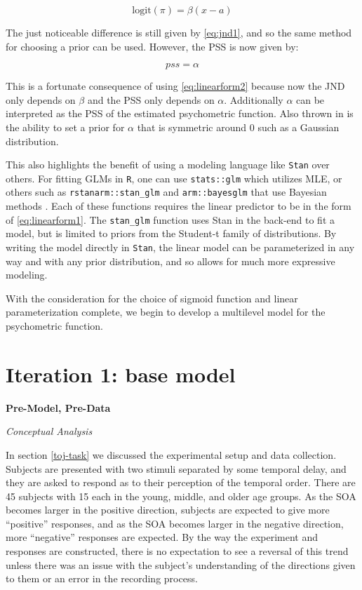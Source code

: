 \documentclass[11pt, oneside, openany]{scrbook}
\begin{document}
\begin{equation}
  \mathrm{logit}(\pi) = \beta(x - a)
  \label{eq:pfform2}
\end{equation}

The just noticeable difference is still given by \eqref{eq:jnd1}, and so the same method for choosing a prior can be used. However, the PSS is now given by:

\[pss = \alpha\]

This is a fortunate consequence of using \eqref{eq:linearform2} because now the JND only depends on \(\beta\) and the PSS only depends on \(\alpha\). Additionally \(\alpha\) can be interpreted as the PSS of the estimated psychometric function. Also thrown in is the ability to set a prior for \(\alpha\) that is symmetric around \(0\) such as a Gaussian distribution.

This also highlights the benefit of using a modeling language like \texttt{Stan} over others. For fitting GLMs in \texttt{R}, one can use \texttt{stats::glm} which utilizes MLE, or others such as \texttt{rstanarm::stan\_glm} and \texttt{arm::bayesglm} that use Bayesian methods \citep{R-rstanarm, R-arm}. Each of these functions requires the linear predictor to be in the form of \eqref{eq:linearform1}. The \texttt{stan\_glm} function uses Stan in the back-end to fit a model, but is limited to priors from the Student-t family of distributions. By writing the model directly in \texttt{Stan}, the linear model can be parameterized in any way and with any prior distribution, and so allows for much more expressive modeling.

With the consideration for the choice of sigmoid function and linear parameterization complete, we begin to develop a multilevel model for the psychometric function.

\hypertarget{iter1}{%
\section{Iteration 1: base model}\label{iter1}}

\textbf{Pre-Model, Pre-Data}

\emph{Conceptual Analysis}

In section \ref{toj-task} we discussed the experimental setup and data collection. Subjects are presented with two stimuli separated by some temporal delay, and they are asked to respond as to their perception of the temporal order. There are 45 subjects with 15 each in the young, middle, and older age groups. As the SOA becomes larger in the positive direction, subjects are expected to give more ``positive'' responses, and as the SOA becomes larger in the negative direction, more ``negative'' responses are expected. By the way the experiment and responses are constructed, there is no expectation to see a reversal of this trend unless there was an issue with the subject's understanding of the directions given to them or an error in the recording process.
\end{document}
